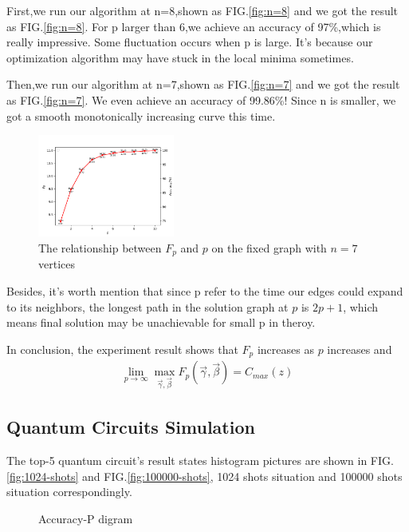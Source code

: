 First,we run our algorithm at n=8,shown as FIG.\ref{fig:n=8} and we got the result as FIG.\ref{fig:n=8}. For p larger than 6,we achieve an accuracy of 97\%,which is really impressive. Some fluctuation occurs when p is large. It's because our optimization algorithm may have stuck in the local minima sometimes. 

Then,we run our algorithm at n=7,shown as FIG.\ref{fig:n=7} and we got the result as FIG.\ref{fig:n=7}. We even achieve an accuracy of 99.86\%! Since n is smaller, we got a smooth monotonically increasing curve this time.
\begin{figure}[!htb]
    \centering
        \includegraphics[width=0.4\textwidth]{pic/result_7.png}
        \caption{The relationship between $F_p$ and $p$ on the fixed graph with $n=7$ vertices}
    \label{fig:result_7}
\end{figure}


Besides, it's worth mention that since p refer to the time our edges could expand to its neighbors, the longest path in the solution graph at $p$ is $2p+1$\cite{farhi2014quantum}, which means final solution may be unachievable for small p in theroy. 

In conclusion, the experiment result shows that $F_p$ increases as $p$ increases and 
\begin{align*}
    \lim_{p\rightarrow \infty}\max_{\vec{\gamma}, \vec{\beta}}{F_p(\vec{\gamma}, \vec{\beta})}=C_{max}(z)
\end{align*}







\subsection{Quantum Circuits Simulation}


The top-5 quantum circuit's result states histogram pictures are shown in FIG.\ref{fig:1024-shots} and FIG.\ref{fig:100000-shots}, 1024 shots situation and 100000 shots situation correspondingly.
\begin{figure}[!htb]
    \centering
    \caption{Accuracy-P digram}
    \label{fig:Accuracy-P}
\end{figure}

